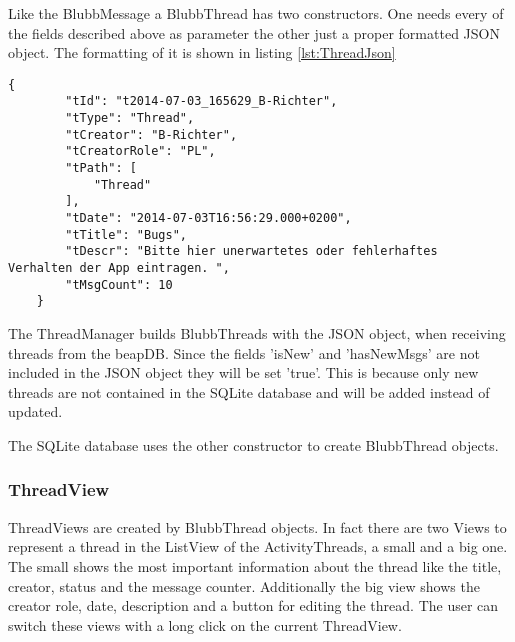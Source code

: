 \documentclass[12pt,a4paper,oneside]{report}
\begin{document}
Like the BlubbMessage a BlubbThread has two constructors. One needs every of the fields described above as parameter the other just a proper formatted JSON object. The formatting of it is shown in listing \ref{lst:ThreadJson}

\begin{lstlisting}[caption=Thread JSON object, label=lst:ThreadJson]
{
        "tId": "t2014-07-03_165629_B-Richter",
        "tType": "Thread",
        "tCreator": "B-Richter",
        "tCreatorRole": "PL",
        "tPath": [
            "Thread"
        ],
        "tDate": "2014-07-03T16:56:29.000+0200",
        "tTitle": "Bugs",
        "tDescr": "Bitte hier unerwartetes oder fehlerhaftes 		Verhalten der App eintragen. ",
        "tMsgCount": 10
    }
\end{lstlisting}
The ThreadManager builds BlubbThreads with the JSON object, when receiving threads from the beapDB. Since the fields 'isNew' and 'hasNewMsgs' are not included in the JSON object they will be set 'true'. This is because only new threads are not contained in the SQLite database and will be added instead of updated. 

The SQLite database uses the other constructor to create BlubbThread objects.

\subsubsection{ThreadView}
ThreadViews are created by BlubbThread objects. In fact there are two Views to represent a thread in the ListView of the ActivityThreads, a small and a big one. 
The small shows the most important information about the thread like the title, creator, status and the message counter. Additionally the big view shows the creator role, date, description and a button for editing the thread. The user can switch these views with a long click on the current ThreadView. 
\end{document}
